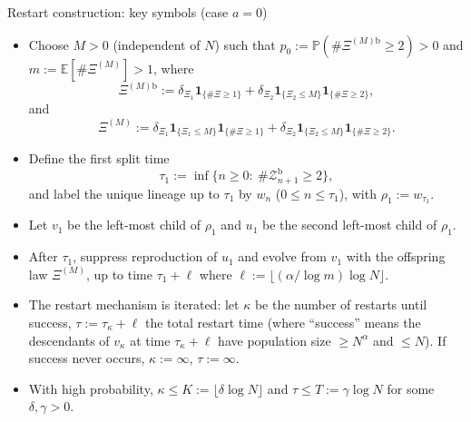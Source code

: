 \begin{block}{Restart construction: key symbols (case $a=0$)}
\begin{itemize}
    \item Choose $M>0$ (independent of $N$) such that
    $p_0:=\mathbb P(\#\Xi^{(M)\mathrm b}\ge 2)>0$
    and $m:=\mathbb E[\#\Xi^{(M)}]>1$, where
    \[
        \Xi^{(M)\mathrm b}
        :=
        \delta_{\Xi_1}\mathbf 1_{\{\#\Xi\ge 1\}}
        +
        \delta_{\Xi_2}\mathbf 1_{\{\Xi_2\le M\}}\mathbf 1_{\{\#\Xi\ge 2\}},
    \]
    and
    \[
        \Xi^{(M)}
        :=
        \delta_{\Xi_1}\mathbf 1_{\{\Xi_1\le M\}}\mathbf 1_{\{\#\Xi\ge 1\}}
        +
        \delta_{\Xi_2}\mathbf 1_{\{\Xi_2\le M\}}\mathbf 1_{\{\#\Xi\ge 2\}}.
    \]
    \item Define the first split time
    \[
        \tau_1:=\inf\{n\ge 0:\ \#\mathcal Z^{\mathrm b}_{n+1}\ge 2\},
    \]
    and label the unique lineage up to $\tau_1$ by $w_n$ ($0\le n\le\tau_1$), with $\rho_1:=w_{\tau_1}$.
    \item Let $v_1$ be the left-most child of $\rho_1$ and $u_1$ be the second left-most child of $\rho_1$.
    \item After $\tau_1$, suppress reproduction of $u_1$ and evolve from $v_1$ with the offspring law $\Xi^{(M)}$,
    up to time $\tau_1+\ell$ where $\ell:=\lfloor(\alpha/\log m)\log N\rfloor$.
    \item The restart mechanism is iterated: let $\kappa$ be the number of restarts until success,
    $\tau:=\tau_\kappa+\ell$ the total restart time
    (where ``success'' means the descendants of $v_\kappa$ at time $\tau_\kappa+\ell$
    have population size $\ge N^\alpha$ and $\le N$).
    If success never occurs, $\kappa:=\infty$, $\tau:=\infty$.
    \item With high probability, $\kappa\le K:=\lfloor\delta\log N\rfloor$
    and $\tau\le T:=\gamma\log N$ for some $\delta,\gamma>0$.
\end{itemize}
\end{block}

